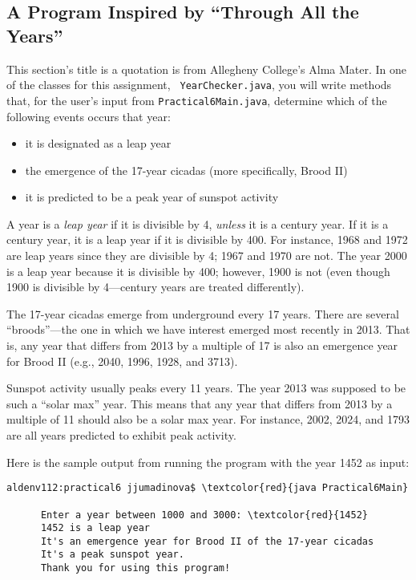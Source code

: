 \vspace*{-.1in}
\subsection*{A Program Inspired by ``Through All the Years''}
\vspace*{-.05in}

This section's title is a quotation is from Allegheny College's Alma Mater. In one of the classes for this assignment, {\tt
YearChecker.java}, you will write methods that, for the user's input from {\tt Practical6Main.java}, determine which of
the following events occurs that year: \begin{itemize}

\item
it is designated as a leap year

\item
the emergence of the 17-year cicadas (more specifically, Brood II)

\item
it is predicted to be a peak year of sunspot activity

\end{itemize}

\noindent A year is a {\em leap year} if it is divisible by 4, {\em unless} it is a century year. If it is a century
year, it is a leap year if it is divisible by 400. For instance, 1968 and 1972 are leap years since they are divisible
by 4; 1967 and 1970 are not.  The year 2000 is a leap year because it is divisible by 400; however, 1900 is not (even
though 1900 is divisible by 4---century years are treated differently).

\noindent The 17-year cicadas emerge from underground every 17 years. There are several ``broods''---the one in which we
have interest emerged most recently in 2013. That is, any year that differs from 2013 by a multiple of 17 is also an
emergence year for Brood II (e.g., 2040, 1996, 1928, and 3713).

\noindent Sunspot activity usually peaks every 11 years. The year 2013 was supposed to be such a ``solar max'' year.
This means that any year that differs from 2013 by a multiple of 11 should also be a solar max year. For instance, 2002,
2024, and 1793 are all years predicted to exhibit peak activity.

\noindent Here is the sample output from running the program with the year 1452 as input:

\begin{Verbatim}[commandchars=\\\{\}]
      aldenv112:practical6 jjumadinova$ \textcolor{red}{java Practical6Main}

      Enter a year between 1000 and 3000: \textcolor{red}{1452}
      1452 is a leap year
      It's an emergence year for Brood II of the 17-year cicadas
      It's a peak sunspot year.
      Thank you for using this program!
\end{Verbatim}


